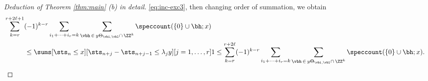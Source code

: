 \documentclass[12pt, reqno, twoside, letterpaper]{amsart}
\begin{document}
\begin{nixnix}
\begin{proof}[Deduction of Theorem \ref{thm:main} (b) in detail]
\eqref{eq:inc-exc3}, then changing order of summation, we obtain 
\begin{align}
 \begin{split}
  \label{eq:inc-exc4}
 & 
   \sum_{k = r}^{r + 2\ell + 1}
    (-1)^{k - r}
     \sum_{i_1 + \cdots + i_r = k}
      \sum_{\vbh \, \in \, y\Theta_{\vbi,\vbl} \cap \, \ZZ^k}
        \speccount(\{0\} \cup \bh; x)
 \\
 & \hspace{30pt} 
  \le 
     \sums[\sts_n \le x]
          [\sts_{n + j} - \sts_{n + j - 1} \le \lambda_j y]
          [j = 1,\ldots,r] 1 
   \le 
    \sum_{k = r}^{r + 2\ell}
     (-1)^{k - r}
      \sum_{i_1 + \cdots + i_r = k}
       \sum_{\vbh \, \in \, y\Theta_{\vbi,\vbl} \cap \, \ZZ^k}
        \speccount(\{0\} \cup \bh; x).
  \end{split}            
\end{align}


\end{proof}
\end{nixnix}
\end{document}
